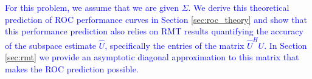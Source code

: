 \textcolor{blue}{For this problem, we assume that we are given $\Sigma$. We derive this theoretical prediction of ROC performance curves in Section \ref{sec:roc_theory} and show that this performance prediction also relies on RMT results quantifying the accuracy of the subspace estimate $\widehat{U}$, specifically the entries of the matrix $\widehat{U}^HU$. In Section \ref{sec:rmt} we provide an asymptotic diagonal approximation to this matrix that makes the ROC prediction possible.}
